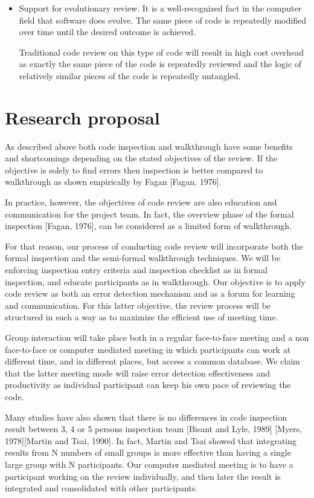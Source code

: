 \begin {itemize}
\item Support for evolutionary review. 
It is a well-recognized fact in the computer field that software does
evolve. The same piece of code is repeatedly modified over time
until the desired outcome is achieved.

Traditional code review on this type of code will result in 
high cost overhead as exactly the same piece of the code is
repeatedly reviewed and the logic of relatively similar pieces
of the code is repeatedly untangled.

\end {itemize}

\section {Research proposal}

As described above
both code inspection and walkthrough have some benefits and
shortcomings depending on the stated
objectives of the review.  If
the objective is solely to find errors then inspection is
better compared to walkthrough as shown empirically by Fagan [Fagan, 1976].

In practice, however, the objectives of code review are also
education and communication for the project team.  
In fact, the overview phase of the formal
inspection [Fagan, 1976], can be considered
as a limited form of walkthrough.

For that reason, our process of conducting
code review  will incorporate both
the formal inspection and the semi-formal walkthrough
techniques. We will be enforcing inspection entry criteria and
inspection checklist as in formal inspection,
and educate participants
as in walkthrough.  Our objective is to apply code review as both
an error detection mechanism and as a forum for learning and communication.
For this latter objective, the review process will be structured in such a way
as to maximize the efficient use of meeting time.

Group interaction will take place both in a regular face-to-face
meeting and a non face-to-face or computer mediated meeting in which
participants can work at different time, and in different places,
but access a common database.
We claim that the latter meeting mode  will raise
error detection effectiveness and productivity as individual 
participant can keep 
his own pace of reviewing the code.  

Many studies have also shown 
that there is no differences in code inspection result between 3, 4
or 5 persons inspection team 
[Bisant and Lyle, 1989] [Myers, 1978][Martin and Tsai, 1990]. 
In fact,  Martin and Tsai showed that
integrating results from N numbers of small groups is more effective than
having a single large group with N participants.
Our computer mediated meeting  is  to have a participant working on the 
review individually, and then later the result is integrated and 
consolidated with other participants.

